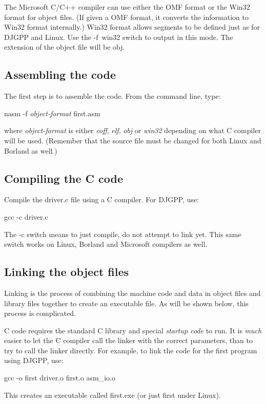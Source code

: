 {The Microsoft C/C++  compiler can use either
the OMF format or the Win32 format for object files. (If given a OMF
format, it converts the information to Win32 format internally.) Win32
format allows segments to be defined just as for DJGPP and Linux. Use
the {\code -f~win32} switch to output in this mode. The extension of
the object file will be {\code obj}.

\subsection{Assembling the code}

The first step is to assemble the code. From the command line, type:
\begin{CodeQuote}
nasm -f {\em object-format} first.asm
\end{CodeQuote}
where {\em object-format} is either {\em coff\/}, {\em elf\/}, {\em obj} or
{\em win32} depending on what C compiler will be used. (Remember that the
source file must be changed for both Linux and Borland as well.)


\subsection{Compiling the C code}

Compile the {\code driver.c} file using a C compiler. For DJGPP, use:
\begin{CodeQuote}
gcc -c driver.c
\end{CodeQuote}
The {\code -c} switch means to just compile, do not attempt to link yet. This
same switch works on Linux, Borland and Microsoft compilers as well.

\subsection{Linking the object files \label{seq:linking} }

Linking is the process of combining the machine code and data in
object files and library files together to create an executable
file. As will be shown below, this process is complicated.

C code requires the standard C library and special \emph{startup code}
 to run.  It is \emph{much} easier to let the C
compiler call the linker with the correct parameters, than to try to
call the linker directly. For example, to link the code for the first
program using DJGPP,  use:
\begin{CodeQuote}
gcc -o first driver.o first.o asm\_io.o
\end{CodeQuote}
This creates an executable called {\code first.exe} (or just {\code first}
under Linux). 

}

